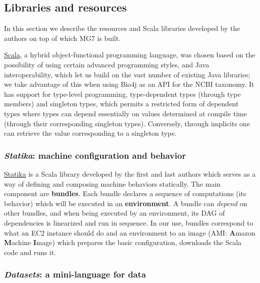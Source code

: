 \documentclass{frontiersSCNS} %
\begin{document}
\subsection{Libraries and resources}\label{libraries-and-resources}

In this section we describe the resources and Scala libraries developed
by the authors on top of which MG7 is built.

\href{http://www.scala-lang.org/}{Scala}, a hybrid object-functional
programming language, was chosen based on the possibility of using
certain advanced programming styles, and Java interoperability, which
let us build on the vast number of existing Java libraries; we take
advantage of this when using Bio4j as an API for the NCBI taxonomy. It
has support for type-level programming, type-dependent types (through
type members) and singleton types, which permits a restricted form of
dependent types where types can depend essentially on values determined
at compile time (through their corresponding singleton types).
Conversely, through implicits one can retrieve the value corresponding
to a singleton type.

\subsubsection{\texorpdfstring{\emph{Statika}: machine configuration and
behavior}{Statika: machine configuration and behavior}}\label{statika-machine-configuration-and-behavior}

\href{https://github.com/ohnosequences/statika}{Statika} is a Scala
library developed by the first and last authors which serves as a way of
defining and composing machine behaviors statically. The main component
are \textbf{bundles}. Each bundle declares a sequence of computations
(its behavior) which will be executed in an \textbf{environment}. A
bundle can \emph{depend} on other bundles, and when being executed by an
environment, its DAG of dependencies is linearized and run in sequence.
In our use, bundles correspond to what an EC2 instance should do and an
environment to an image (AMI: \textbf{A}mazon \textbf{M}achine
\textbf{I}mage) which prepares the basic configuration, downloads the
Scala code and runs it.

\subsubsection{\texorpdfstring{\emph{Datasets}: a mini-language for
data}{Datasets: a mini-language for data}}\label{datasets-a-mini-language-for-data}
\end{document}
